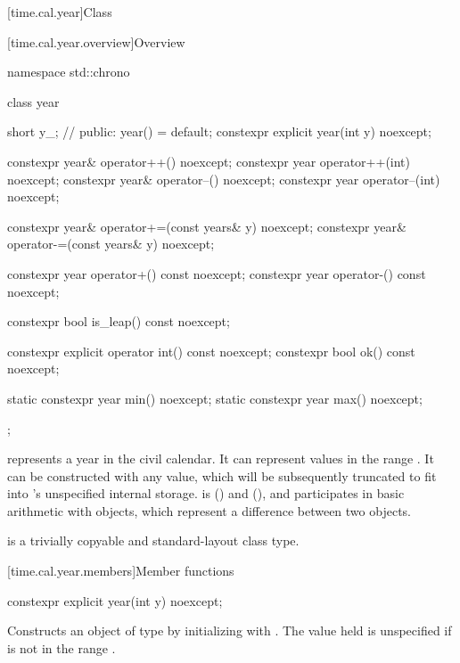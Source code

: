 [time.cal.year]{Class }

[time.cal.year.overview]{Overview}

\begin{codeblock}
namespace std::chrono {
  class year {
    short y_;                   // \expos
  public:
    year() = default;
    constexpr explicit year(int y) noexcept;

    constexpr year& operator++()    noexcept;
    constexpr year  operator++(int) noexcept;
    constexpr year& operator--()    noexcept;
    constexpr year  operator--(int) noexcept;

    constexpr year& operator+=(const years& y) noexcept;
    constexpr year& operator-=(const years& y) noexcept;

    constexpr year operator+() const noexcept;
    constexpr year operator-() const noexcept;

    constexpr bool is_leap() const noexcept;

    constexpr explicit operator int() const noexcept;
    constexpr bool ok() const noexcept;

    static constexpr year min() noexcept;
    static constexpr year max() noexcept;
  };
}
\end{codeblock}

\pnum
{} represents a year in the civil calendar.
It can represent values in the range .
It can be constructed with any  value,
which will be subsequently truncated to fit into 's unspecified internal storage.
 is  ()
and  (),
and participates in basic arithmetic with  objects,
which represent a difference between two  objects.

\pnum
{} is a trivially copyable and standard-layout class type.

[time.cal.year.members]{Member functions}

%
\begin{itemdecl}
constexpr explicit year(int y) noexcept;
\end{itemdecl}

\begin{itemdescr}
\pnum
\effects
Constructs an object of type  by
initializing  with .
The value held is unspecified if  is not in the range .
\end{itemdescr}

